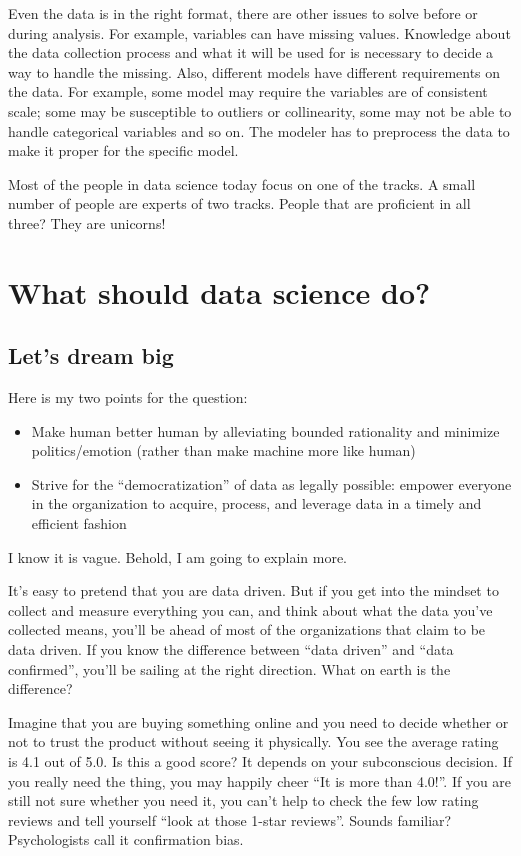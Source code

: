 \documentclass[12pt,]{krantz}
\providecommand{\tightlist}{%
  \setlength{\itemsep}{0pt}\setlength{\parskip}{0pt}}
\theoremstyle{definition}
\theoremstyle{definition}
\theoremstyle{definition}
\theoremstyle{remark}
\begin{document}
Even the data is in the right format, there are other issues to solve
before or during analysis. For example, variables can have missing
values. Knowledge about the data collection process and what it will be
used for is necessary to decide a way to handle the missing. Also,
different models have different requirements on the data. For example,
some model may require the variables are of consistent scale; some may
be susceptible to outliers or collinearity, some may not be able to
handle categorical variables and so on. The modeler has to preprocess
the data to make it proper for the specific model.

Most of the people in data science today focus on one of the tracks. A
small number of people are experts of two tracks. People that are
proficient in all three? They are unicorns!

\section{What should data science
do?}\label{what-should-data-science-do}

\subsection{Let's dream big}\label{lets-dream-big}

Here is my two points for the question:

\begin{itemize}
\tightlist
\item
  Make human better human by alleviating bounded rationality and
  minimize politics/emotion (rather than make machine more like human)
\item
  Strive for the ``democratization'' of data as legally possible:
  empower everyone in the organization to acquire, process, and leverage
  data in a timely and efficient fashion
\end{itemize}

I know it is vague. Behold, I am going to explain more.

It's easy to pretend that you are data driven. But if you get into the
mindset to collect and measure everything you can, and think about what
the data you've collected means, you'll be ahead of most of the
organizations that claim to be data driven. If you know the difference
between ``data driven'' and ``data confirmed'', you'll be sailing at the
right direction. What on earth is the difference?

Imagine that you are buying something online and you need to decide
whether or not to trust the product without seeing it physically. You
see the average rating is 4.1 out of 5.0. Is this a good score? It
depends on your subconscious decision. If you really need the thing, you
may happily cheer ``It is more than 4.0!''. If you are still not sure
whether you need it, you can't help to check the few low rating reviews
and tell yourself ``look at those 1-star reviews''. Sounds familiar?
Psychologists call it confirmation bias.
\end{document}
